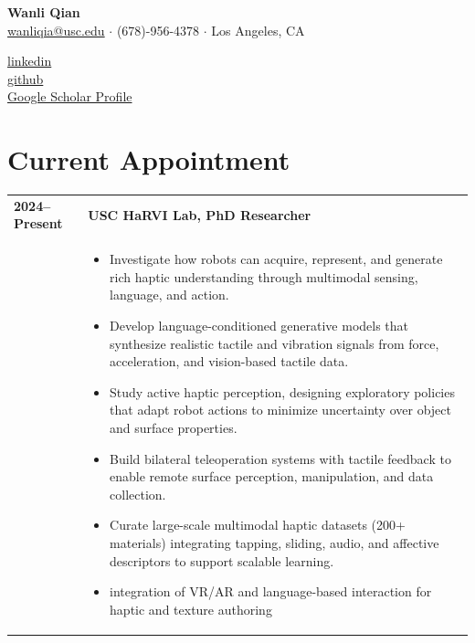 \documentclass[12pt, letterpaper]{article}
\newlength{\datecolwidth}
\begin{document}
\noindent
\begin{minipage}[t]{0.65\textwidth}
    {\huge \textbf{Wanli Qian}} \\
    \vspace{2pt}
    \href{mailto:wanliqia@usc.edu}{wanliqia@usc.edu} $\cdot$ (678)-956-4378 $\cdot$ Los Angeles, CA
\end{minipage}%
\begin{minipage}[t]{0.35\textwidth}
    \raggedleft
    \href{https://www.linkedin.com/in/wanli-qian-7bb399192/}{linkedin} \\
    \href{https://github.com/silverwings-zero}{github} \\
    \href{https://scholar.google.com/citations?user=azFoAIkAAAAJ&hl=en}{Google Scholar Profile}
\end{minipage}

\vspace{0.2cm}

\section*{Current Appointment}
\noindent
\begin{tabularx}{\textwidth}{@{}p{\datecolwidth} X@{}}
    \textbf{2024--Present} & \textbf{USC HaRVI Lab, PhD Researcher} \\
    & \begin{itemize}[leftmargin=*, nosep, after=\vspace{4pt}]
        \item Investigate how robots can acquire, represent, and generate rich haptic understanding through multimodal sensing, language, and action.
        \item Develop language-conditioned generative models that synthesize realistic tactile and vibration signals from force, acceleration, and vision-based tactile data.
        \item Study active haptic perception, designing exploratory policies that adapt robot actions to minimize uncertainty over object and surface properties.
        \item Build bilateral teleoperation systems with tactile feedback to enable remote surface perception, manipulation, and data collection.
        \item Curate large-scale multimodal haptic datasets (200+ materials) integrating tapping, sliding, audio, and affective descriptors to support scalable learning.
        \item integration of VR/AR and language-based interaction for haptic and texture authoring
    \end{itemize}
\end{tabularx}
\end{document}
